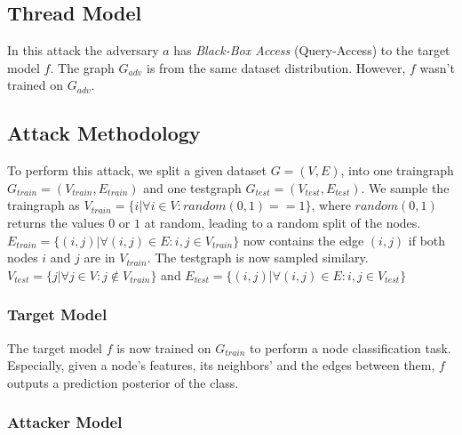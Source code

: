     \subsection{Thread Model}

      In this attack the adversary $a$ has \emph{Black-Box Access} (Query-Access) to the target model $f$. 
      The graph $G_{adv}$ is from the same dataset distribution. 
      However, $f$ wasn't trained on $G_{adv}$.

    \subsection{Attack Methodology}

      To perform this attack, we split a given dataset $G = (V, E)$, into one traingraph $G_{train} = (V_{train}, E_{train})$ and one testgraph $G_{test} = (V_{test}, E_{test})$.  
      We sample the traingraph as $V_{train} = \{i | \forall i \in V: random(0, 1) == 1\}$, where $random(0, 1)$ returns the values $0$ or $1$ at random, leading to a random split of the nodes.
      $E_{train} = \{(i, j) | \forall (i,j) \in E: i, j \in V_{train}\}$ now contains the edge $(i,j)$ if both nodes $i$ and $j$ are in $V_{train}$.
      The testgraph is now sampled similary.
      $V_{test} = \{j | \forall j \in V: j \not\in V_{train}\}$ and $E_{test} = \{(i, j) | \forall (i,j) \in E: i, j \in V_{test}\}$

      \subsubsection{Target Model}

        The target model $f$ is now trained on $G_{train}$ to perform a node classification task.
        Especially, given a node's features, its neighbors' and the edges between them, $f$ outputs a prediction posterior of the class.

      \subsubsection{Attacker Model}

